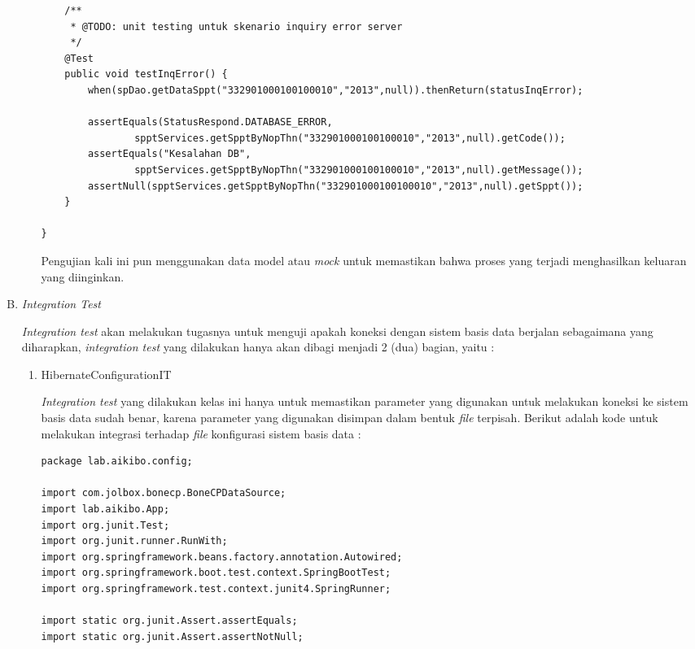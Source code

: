 \documentclass[pdftex,12pt, oneside]{article}
\begin{document}
\begin{enumerate}[A.]
\begin{enumerate}[1.]
\begin{lstlisting}
    /**
     * @TODO: unit testing untuk skenario inquiry error server
     */
    @Test
    public void testInqError() {
        when(spDao.getDataSppt("332901000100100010","2013",null)).thenReturn(statusInqError);

        assertEquals(StatusRespond.DATABASE_ERROR,
                spptServices.getSpptByNopThn("332901000100100010","2013",null).getCode());
        assertEquals("Kesalahan DB",
                spptServices.getSpptByNopThn("332901000100100010","2013",null).getMessage());
        assertNull(spptServices.getSpptByNopThn("332901000100100010","2013",null).getSppt());
    }

}
    \end{lstlisting}
    
    Pengujian kali ini pun menggunakan data model atau \textit{mock} untuk memastikan bahwa proses yang terjadi menghasilkan keluaran yang diinginkan.
    
  \end{enumerate}
  
  \item \textit{Integration Test}
  
  \textit{Integration test} akan melakukan tugasnya untuk menguji apakah koneksi dengan sistem basis data berjalan sebagaimana yang diharapkan, \textit{integration test} yang dilakukan hanya akan dibagi menjadi 2 (dua) bagian, yaitu :
  
  \begin{enumerate}[1.]
    \item HibernateConfigurationIT
    
    \textit{Integration test} yang dilakukan kelas ini hanya untuk memastikan parameter yang digunakan untuk melakukan koneksi ke sistem basis data sudah benar, karena parameter yang digunakan disimpan dalam bentuk \textit{file} terpisah. Berikut adalah kode untuk melakukan integrasi terhadap \textit{file} konfigurasi sistem basis data :
    
    \begin{lstlisting}
package lab.aikibo.config;

import com.jolbox.bonecp.BoneCPDataSource;
import lab.aikibo.App;
import org.junit.Test;
import org.junit.runner.RunWith;
import org.springframework.beans.factory.annotation.Autowired;
import org.springframework.boot.test.context.SpringBootTest;
import org.springframework.test.context.junit4.SpringRunner;

import static org.junit.Assert.assertEquals;
import static org.junit.Assert.assertNotNull;


\end{lstlisting}
\end{enumerate}
\end{enumerate}
\end{document}
